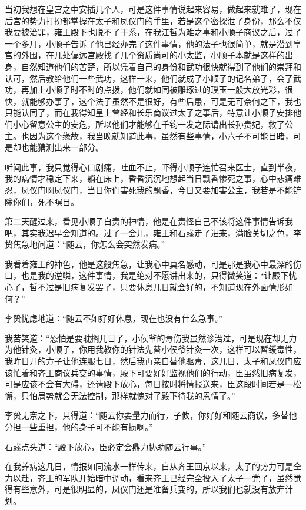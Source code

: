 当初我想在皇宫之中安插几个人，可是这件事情说起来容易，做起来就难了，现在后宫的势力打扮都掌握在太子和凤仪门的手里，若是这个密探泄了身份，那么不仅我要被治罪，雍王殿下也脱不了干系，在我江哲为难之事和小顺子商议之后，过了一个多月，小顺子告诉了他已经办完了这件事情，他的法子也很简单，就是潜到皇宫的外围，在几处偏远宫殿找了几个资质尚可的小太监，小顺子本就是这样的出身，自然知道他们的苦楚，所以凭着自己的身份和武功很快就得到了他们的崇拜和认可，然后教给他们一些武功，这样一来，他们就成了小顺子的记名弟子，会了武功，再加上小顺子时不时的点拨，他们就如同被雕琢过的璞玉一般大放光彩，很快，就能够办事了，这个法子虽然不是很好，有些后患，可是无可奈何之下，我也只能认同了，而在我得知皇上曾经和长乐商议过太子之事后，特意让小顺子安排他们小心留意公主的安危，所以他们才能够在千钧一发之际请出长孙贵妃，救了公主。也因为这个缘故，我当晚就知道此事，虽然有些事情，小六子不可能目睹，可是却也能猜测出来一部分。

听闻此事，我只觉得心口剧痛，吐血不止，吓得小顺子连忙召来医士，直到半夜，我的病情才稳定下来，躺在床上，昏昏沉沉地想起当日飘香惨死之事，心中悲痛难忍，凤仪门啊凤仪门，当日你们害死我的飘香，今日又要加害公主，我若是不能铲除你们，死不瞑目。

第二天醒过来，看见小顺子自责的神情，他是在责怪自己不该将这件事情告诉我吧，其实我迟早会知道的。过了一会儿，雍王和石彧走了进来，满脸关切之色，李贽焦急地问道：“随云，你怎么会突然发病。”

我看着雍王的神色，他是这般焦急，让我心中莫名感动，可是那是我心中最深的伤口，也是我的逆鳞，这件事情，我是绝对不愿讲出来的，只得微笑道：“让殿下忧心了，哲不过是旧病复发罢了，只要休息几日就会好的，不知道现在外面情形如何？”

李贽忧虑地道：“随云不如好好休息，现在也没有什么急事。”

我苦笑道：“恐怕是要耽搁几日了，小侯爷的毒伤我虽然诊治过，可是现在却无力为他针灸，小顺子，你用我教你的针法先替小侯爷针灸一次，这样可以暂缓毒性，我昨日开的方子让他连服七日，然后我再亲自替他驱毒，这几日，太子和凤仪门应该忙着和齐王商议兵变的事情，殿下可要好好监视他们的行动，臣虽然旧病复发，可是应该不会有大碍，还请殿下放心，每日按时将情报送来，臣这段时间若是一松懈，只怕局势就会无法控制，那样就愧对了殿下待我的恩情了。”

李贽无奈之下，只得道：“随云你要量力而行，子攸，你好好和随云商议，多替他分担一些重担，他的身子可不能有损啊。”

石彧点头道：“殿下放心，臣必定会鼎力协助随云行事。”

在我养病这几日，情报如同流水一样传来，自从齐王回京以来，太子的势力可是全力以赴，齐王的军队开始暗中调动，看来齐王已经完全投入了太子一党了，虽然觉得有些意外，可是很明显的，凤仪门还是准备兵变的，所以我们也就没有放弃计划。

